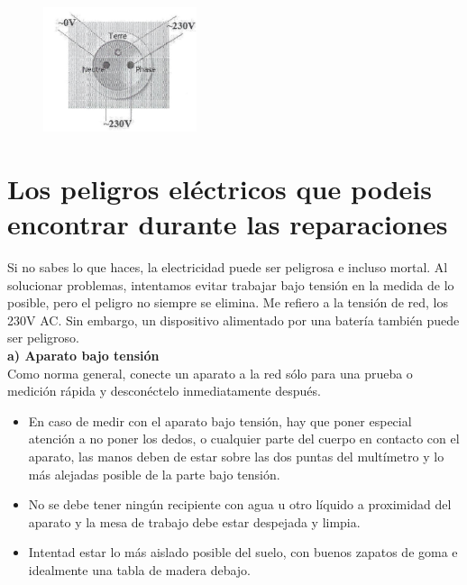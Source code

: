 \documentclass[a5paper,twoside,openany]{book}
\begin{document}
\begin{figure}[h]
\includegraphics[width=0.4\textwidth]{diagrama-enchufe} 
\centering
\end{figure}

\section{Los peligros eléctricos que podeis encontrar durante las reparaciones}
Si no sabes lo que haces, la electricidad puede ser peligrosa e incluso mortal.
Al solucionar problemas, intentamos evitar trabajar bajo tensión en la medida de lo posible, pero el peligro no siempre se elimina. Me refiero a la tensión de red, los 230V AC. Sin embargo, un dispositivo alimentado por una batería también puede ser peligroso.\\

\textbf{a) Aparato bajo tensión}\\

Como norma general, conecte un aparato a la red sólo para una prueba o medición rápida y desconéctelo inmediatamente después.

\begin{itemize}
\item En caso de medir con el aparato bajo tensión, hay que poner especial atención a no poner los dedos, o cualquier parte del cuerpo en contacto con el aparato, las manos deben de estar sobre las dos puntas del multímetro y lo más alejadas posible de la parte bajo tensión.
\item No se debe tener ningún recipiente con agua u otro líquido a proximidad del aparato y la mesa de trabajo debe estar despejada y limpia.
\item Intentad estar lo más aislado posible del suelo, con buenos zapatos de goma e idealmente una tabla de madera debajo.
\end{itemize}
\newpage
\end{document}
